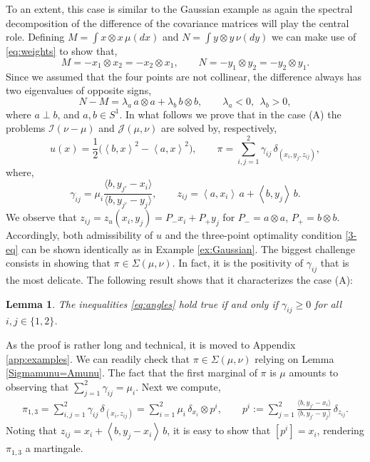 \documentclass[11pt,letterpaper,reqno]{amsart}
\newtheorem{lemma}[theorem]{Lemma}
\theoremstyle{definition}
\numberwithin{equation}{section}
\newcommand{\pairing}[1]{{\left \langle #1 \right \rangle}}
\begin{document}
{To an extent, this case is similar to the Gaussian example as again the spectral decomposition of the difference of the covariance matrices will play the central role. Defining $M= \int x \otimes x \, \mu(dx)$ and $N= \int y \otimes y \, \nu(dy)$ we can make use of \eqref{eq:weights} to show that,
\begin{equation}
	\label{eq:MN_formulas}
	M = - x_1 \otimes x_2 = - x_2 \otimes x_1 , \qquad N= -y_1 \otimes y_2=-y_2 \otimes y_1.
\end{equation}
Since we assumed that the four points are not collinear, the difference always has two eigenvalues of opposite signs,
\begin{equation*}
	N-M = \lambda_a \, a \otimes a + \lambda_b \, b \otimes b, \qquad \lambda_a <0, \ \  \lambda_b>0,
\end{equation*}
where $a \perp b$, and $a,b \in S^1$.
In what follows we prove that in the case (A) the problems $\mathcal{I}(\nu-\mu)$ and $\mathcal{J}(\mu,\nu)$ are solved by, respectively,
\begin{equation}
	\label{upi_caseA}
	u(x) = \frac{1}{2} \big( \pairing{b,x}^2 -\pairing{a,x}^2   \big), \qquad \pi = \sum_{i,j=1}^{2} \gamma_{ij}\, \delta_{(x_i,y_j,z_{ij})},
\end{equation}
where,
\begin{equation}
	\label{eq:zij_rij}
		\gamma_{ij}= \mu_i \frac{\langle b,y_{j'} -x_i\rangle }{\langle b, y_{j'}-y_j \rangle}, \qquad z_{ij} =  \pairing{a,x_i} \, a + \pairing{b,y_j}\,b.
\end{equation}
We observe that $z_{ij} = z_u(x_i,y_j) = P_- x_i +P_+ y_j$ for $P_- = a\otimes a$, $P_+ = b \otimes b$. Accordingly, both admissibility of $u$ and  the three-point optimality condition \eqref{3-eq} can be shown identically as in Example \ref{ex:Gaussian}. The biggest challenge consists in showing that $\pi \in \Sigma(\mu,\nu)$. In fact, it is the positivity of $\gamma_{ij}$ that is the most delicate. The following result shows that it characterizes the case (A):
\begin{lemma}
	\label{lem:positive_rij}
	The  inequalities \eqref{eq:angles} hold true if and only if $\gamma_{ij} \geq 0 $ for all $i,j \in \{1,2\}$.
\end{lemma}
\noindent As the proof is rather long and technical, it is moved to Appendix \ref{app:examples}. We can readily check that $\pi \in \Sigma(\mu,\nu)$ relying on Lemma \ref{Sigmamunu=Amunu}. The fact that the first marginal of $\pi$ is $\mu$ amounts to observing that $\sum_{j=1}^2 \gamma_{ij} = \mu_i$. Next we compute,
\begin{align*}
	\pi_{1,3}  = \sum_{i,j=1}^2 \gamma_{ij} \, \delta_{(x_i,z_{ij})} = \sum_{i=1}^2 \mu_i \, \delta_{x_i}\!  \otimes p^i, \qquad p^i := \sum_{j=1}^2 \frac{\langle b,y_{j'} -x_i\rangle }{\langle b, y_{j'}-y_j \rangle}  \,\delta_{z_{ij}}.
\end{align*}
Noting that  $z_{ij} = x_i+ \pairing{b,y_j-x_i} \, b$, it is easy to show that $[p^i] = x_i$, rendering $\pi_{1,3}$ a martingale.

}
\end{document}
